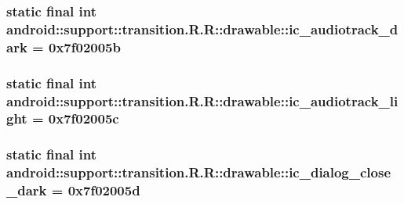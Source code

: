 \hypertarget{classandroid_1_1support_1_1transition_1_1_r_1_1drawable_f094d6f014d4b2f12d405c99b402a5d2}{
\subsubsection[{ic\_\-audiotrack\_\-dark}]{\setlength{\rightskip}{0pt plus 5cm}static final int android::support::transition.R.R::drawable::ic\_\-audiotrack\_\-dark = 0x7f02005b}}
\label{classandroid_1_1support_1_1transition_1_1_r_1_1drawable_f094d6f014d4b2f12d405c99b402a5d2}


\hypertarget{classandroid_1_1support_1_1transition_1_1_r_1_1drawable_6a75c1d54db3834fdd0efa520b75cb22}{
\subsubsection[{ic\_\-audiotrack\_\-light}]{\setlength{\rightskip}{0pt plus 5cm}static final int android::support::transition.R.R::drawable::ic\_\-audiotrack\_\-light = 0x7f02005c}}
\label{classandroid_1_1support_1_1transition_1_1_r_1_1drawable_6a75c1d54db3834fdd0efa520b75cb22}


\hypertarget{classandroid_1_1support_1_1transition_1_1_r_1_1drawable_d071e169bec2bec2835ef0937af5d8c3}{
\subsubsection[{ic\_\-dialog\_\-close\_\-dark}]{\setlength{\rightskip}{0pt plus 5cm}static final int android::support::transition.R.R::drawable::ic\_\-dialog\_\-close\_\-dark = 0x7f02005d}}
\label{classandroid_1_1support_1_1transition_1_1_r_1_1drawable_d071e169bec2bec2835ef0937af5d8c3}


